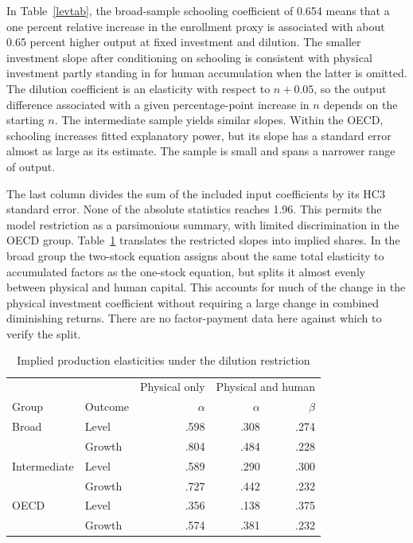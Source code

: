 \documentclass[11pt]{article}
\begin{document}
In Table~\ref{levtab}, the broad-sample schooling coefficient of 0.654 means that a one percent relative increase in the enrollment proxy is associated with about 0.65 percent higher output at fixed investment and dilution. The smaller investment slope after conditioning on schooling is consistent with physical investment partly standing in for human accumulation when the latter is omitted. The dilution coefficient is an elasticity with respect to $n+0.05$, so the output difference associated with a given percentage-point increase in $n$ depends on the starting $n$. The intermediate sample yields similar slopes. Within the OECD, schooling increases fitted explanatory power, but its slope has a standard error almost as large as its estimate. The sample is small and spans a narrower range of output.

The last column divides the sum of the included input coefficients by its HC3 standard error. None of the absolute statistics reaches 1.96. This permits the model restriction as a parsimonious summary, with limited discrimination in the OECD group. Table~\ref{shares} translates the restricted slopes into implied shares. In the broad group the two-stock equation assigns about the same total elasticity to accumulated factors as the one-stock equation, but splits it almost evenly between physical and human capital. This accounts for much of the change in the physical investment coefficient without requiring a large change in combined diminishing returns. There are no factor-payment data here against which to verify the split.

\begin{table}[ht]
\centering
\caption{Implied production elasticities under the dilution restriction}\label{shares}
\begin{tabular}{llrrr}
\toprule
&&Physical only&\multicolumn{2}{c}{Physical and human}\\
Group&Outcome&$\alpha$&$\alpha$&$\beta$\\
\midrule
Broad&Level&.598&.308&.274\\
&Growth&.804&.484&.228\\
Intermediate&Level&.589&.290&.300\\
&Growth&.727&.442&.232\\
OECD&Level&.356&.138&.375\\
&Growth&.574&.381&.232\\
\bottomrule
\end{tabular}
\end{table}
\end{document}
